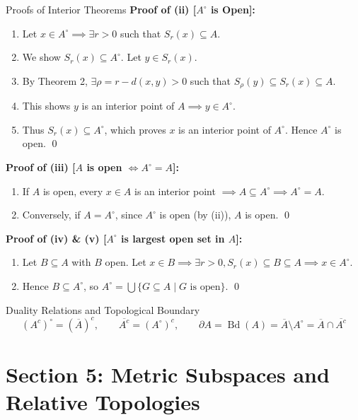 \documentclass[11pt,a4paper]{article}
\begin{document}
\begin{exbox}{Proofs of Interior Theorems}
\textbf{Proof of (ii) [$A^\circ$ is Open]:}
\begin{enumerate}
    \item Let $x \in A^\circ \implies \exists r > 0$ such that $S_r(x) \subseteq A$.
    \item We show $S_r(x) \subseteq A^\circ$. Let $y \in S_r(x)$.
    \item By Theorem 2, $\exists \rho = r - d(x, y) > 0$ such that $S_\rho(y) \subseteq S_r(x) \subseteq A$.
    \item This shows $y$ is an interior point of $A \implies y \in A^\circ$.
    \item Thus $S_r(x) \subseteq A^\circ$, which proves $x$ is an interior point of $A^\circ$. Hence $A^\circ$ is open. \qed
\end{enumerate}

\textbf{Proof of (iii) [$A$ is open $\iff A^\circ = A$]:}
\begin{enumerate}
    \item If $A$ is open, every $x \in A$ is an interior point $\implies A \subseteq A^\circ \implies A^\circ = A$.
    \item Conversely, if $A = A^\circ$, since $A^\circ$ is open (by (ii)), $A$ is open. \qed
\end{enumerate}

\textbf{Proof of (iv) \& (v) [$A^\circ$ is largest open set in $A$]:}
\begin{enumerate}
    \item Let $B \subseteq A$ with $B$ open. Let $x \in B \implies \exists r > 0, S_r(x) \subseteq B \subseteq A \implies x \in A^\circ$.
    \item Hence $B \subseteq A^\circ$, so $A^\circ = \bigcup \{G \subseteq A \mid G \text{ is open}\}$. \qed
\end{enumerate}
\end{exbox}

\begin{formulabox}{Duality Relations and Topological Boundary}
\begin{equation}
    (A^c)^\circ = (\overline{A})^c, \qquad \overline{A^c} = (A^\circ)^c, \qquad \partial A = \operatorname{Bd}(A) = \overline{A} \setminus A^\circ = \overline{A} \cap \overline{A^c}
\end{equation}
\end{formulabox}

\newpage

\section{Section 5: Metric Subspaces and Relative Topologies}
\end{document}
